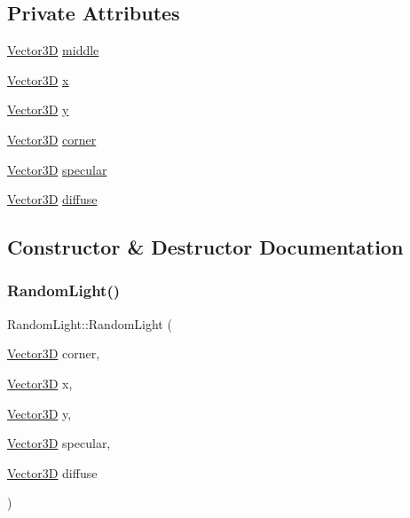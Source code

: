 \subsection*{Private Attributes}
\begin{DoxyCompactItemize}
\item 
\mbox{\hyperlink{classVector3D}{Vector3D}} \mbox{\hyperlink{classRandomLight_a13f0aa6e386b4eb09b786a81d2d9e9ff}{middle}}
\item 
\mbox{\hyperlink{classVector3D}{Vector3D}} \mbox{\hyperlink{classRandomLight_a5582baaa81ff0117f66ef8f3636859ed}{x}}
\item 
\mbox{\hyperlink{classVector3D}{Vector3D}} \mbox{\hyperlink{classRandomLight_a9d9e2fcde9c0d83b655f9a259d54a6d8}{y}}
\item 
\mbox{\hyperlink{classVector3D}{Vector3D}} \mbox{\hyperlink{classRandomLight_ac54b3aa2ddb79d7f7363f64ed0f96989}{corner}}
\item 
\mbox{\hyperlink{classVector3D}{Vector3D}} \mbox{\hyperlink{classRandomLight_ac8014c223873c92490dfb697cc4663d4}{specular}}
\item 
\mbox{\hyperlink{classVector3D}{Vector3D}} \mbox{\hyperlink{classRandomLight_a26ffb2886dbb56b24d77fd8c760c8b28}{diffuse}}
\end{DoxyCompactItemize}


\subsection{Constructor \& Destructor Documentation}
\mbox{\label{classRandomLight_aaa458e28a15e5ac83b393dc689def3a3}} 
\subsubsection{\texorpdfstring{RandomLight()}{RandomLight()}}
{\footnotesize\ttfamily Random\+Light\+::\+Random\+Light (\begin{DoxyParamCaption}\item[{\mbox{\hyperlink{classVector3D}{Vector3D}}}]{corner,  }\item[{\mbox{\hyperlink{classVector3D}{Vector3D}}}]{x,  }\item[{\mbox{\hyperlink{classVector3D}{Vector3D}}}]{y,  }\item[{\mbox{\hyperlink{classVector3D}{Vector3D}}}]{specular,  }\item[{\mbox{\hyperlink{classVector3D}{Vector3D}}}]{diffuse }\end{DoxyParamCaption})}




